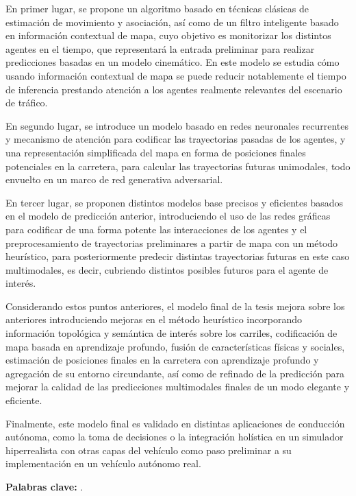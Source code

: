 En primer lugar, se propone un algoritmo basado en técnicas clásicas de estimación de movimiento y asociación, así como de un filtro inteligente basado en información contextual de mapa, cuyo objetivo es monitorizar los distintos agentes en el tiempo, que representará la entrada preliminar para realizar predicciones basadas en un modelo cinemático. En este modelo se estudia cómo usando información contextual de mapa se puede reducir notablemente el tiempo de inferencia prestando atención a los agentes realmente relevantes del escenario de tráfico.

En segundo lugar, se introduce un modelo basado en redes neuronales recurrentes y mecanismo de atención para codificar las trayectorias pasadas de los agentes, y una representación simplificada del mapa en forma de posiciones finales potenciales en la carretera, para calcular las trayectorias futuras unimodales, todo envuelto en un marco de red generativa adversarial.

En tercer lugar, se proponen distintos modelos base precisos y eficientes basados en el modelo de predicción anterior, introduciendo el uso de las redes gráficas para codificar de una forma potente las interacciones de los agentes y el preprocesamiento de trayectorias preliminares a partir de mapa con un método heurístico, para posteriormente predecir distintas trayectorias futuras en este caso multimodales, es decir, cubriendo distintos posibles futuros para el agente de interés.

Considerando estos puntos anteriores, el modelo final de la tesis mejora sobre los anteriores introduciendo mejoras en el método heurístico incorporando información topológica y semántica de interés sobre los carriles, codificación de mapa basada en aprendizaje profundo, fusión de características físicas y sociales, estimación de posiciones finales en la carretera con aprendizaje profundo y agregación de su entorno circundante, así como de refinado de la predicción para mejorar la calidad de las predicciones multimodales finales de un modo elegante y eficiente. 

Finalmente, este modelo final es validado en distintas aplicaciones de conducción autónoma, como la toma de decisiones o la integración holística en un simulador hiperrealista con otras capas del vehículo como paso preliminar a su implementación en un vehículo autónomo real.

\textbf{Palabras clave:} \myThesisKeywords.



